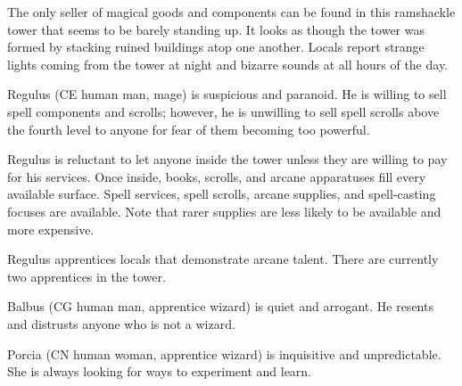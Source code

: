 The only seller of magical goods and components can be found in this ramshackle tower that seems to be barely standing up.
It looks as though the tower was formed by stacking ruined buildings atop one another.
Locals report strange lights coming from the tower at night and bizarre sounds at all hours of the day.

Regulus (CE human man, mage) is suspicious and paranoid.
He is willing to sell spell components and scrolls; however, he is unwilling to sell spell scrolls above the fourth level to anyone for fear of them becoming too powerful.

Regulus is reluctant to let anyone inside the tower unless they are willing to pay for his services.
Once inside, books, scrolls, and arcane apparatuses fill every available surface.
Spell services, spell scrolls, arcane supplies, and spell-casting focuses are available.
Note that rarer supplies are less likely to be available and more expensive.

Regulus apprentices locals that demonstrate arcane talent.
There are currently two apprentices in the tower.

Balbus (CG human man, apprentice wizard) is quiet and arrogant.
He resents and distrusts anyone who is not a wizard.

Porcia (CN human woman, apprentice wizard) is inquisitive and unpredictable.
She is always looking for ways to experiment and learn.
